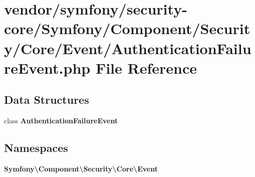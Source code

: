 \section{vendor/symfony/security-\/core/\+Symfony/\+Component/\+Security/\+Core/\+Event/\+Authentication\+Failure\+Event.php File Reference}
\label{_authentication_failure_event_8php}
\subsection*{Data Structures}
\begin{DoxyCompactItemize}
\item 
class {\bf Authentication\+Failure\+Event}
\end{DoxyCompactItemize}
\subsection*{Namespaces}
\begin{DoxyCompactItemize}
\item 
 {\bf Symfony\textbackslash{}\+Component\textbackslash{}\+Security\textbackslash{}\+Core\textbackslash{}\+Event}
\end{DoxyCompactItemize}
